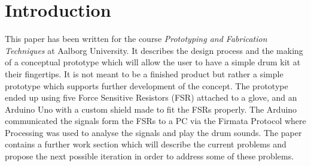 \section*{Introduction}
\label{Introduktion}
This paper has been written for the course \textit{Prototyping and Fabrication Techniques} at Aalborg University. It describes the design process and the making of a conceptual prototype which will allow the user to have a simple drum kit at their fingertips. It is not meant to be a finished product but rather a simple prototype which supports further development of the concept. 
The prototype ended up using five Force Sensitive Resistors (FSR) attached to a glove, and an Arduino Uno with a custom shield made to fit the FSRs properly. The Arduino communicated the signals form the FSRs to a PC via the Firmata Protocol where Processing was used to analyse the signals and play the drum sounds. The paper contains a further work section which will describe the current problems and propose the next possible iteration in order to address some of these problems.